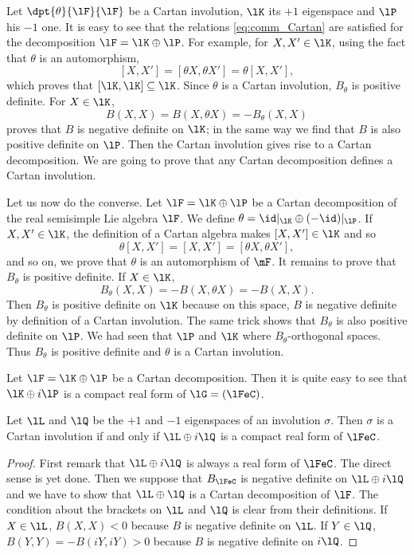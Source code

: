 Let $\dpt{\theta}{\lF}{\lF}$ be a Cartan involution, $\lK$ its $+1$ eigenspace and $\lP$ his $-1$ one. It is easy to see that the relations \eqref{eq:comm_Cartan} are satisfied for the decomposition  $\lF=\lK\oplus\lP$. For example, for $X,X'\in\lK$, using the fact that $\theta$ is an automorphism,
\[
   [X,X']=[\theta X,\theta X']=\theta[X,X'],
\]
which proves that $[\lK,\lK]\subseteq\lK$. Since $\theta$ is a Cartan involution, $B_{\theta}$ is positive definite. For $X\in\lK$,
\[
  B(X,X)=B(X,\theta X)=-B_{\theta}(X,X)
\]
proves that $B$ is negative definite on $\lK$; in the same way we find that $B$ is also positive definite on $\lP$. Then the Cartan involution gives rise to a Cartan decomposition. We are going to prove that any Cartan decomposition defines a Cartan involution.

Let us now do the converse. Let $\lF=\lK\oplus\lP$ be a Cartan decomposition of the real semisimple Lie algebra $\lF$. We define $\theta=\id|_{\lK}\oplus(-\id)|_{\lP}$. If $X,X'\in\lK$, the definition of a Cartan algebra makes $[X,X']\in\lK$ and so
\[
  \theta[X,X']=[X,X']=[\theta X,\theta X'],
\]
and so on, we prove that $\theta$ is an automorphism of $\mF$. It remains to prove that $B_{\theta}$ is positive definite. If $X\in\lK$,
\[
   B_{\theta}(X,X)=-B(X,\theta X)=-B(X,X).
\]
Then $B_{\theta}$ is positive definite on $\lK$ because on this space, $B$ is negative definite by definition of a Cartan involution. The same trick shows that $B_{\theta}$ is also positive definite on $\lP$. We had seen that $\lP$ and $\lK$ where $B_{\theta}$-orthogonal spaces. Thus $B_{\theta}$ is positive definite and $\theta$ is a Cartan involution.

Let $\lF=\lK\oplus\lP$ be a Cartan decomposition. Then it is quite easy to see that $\lK\oplus i\lP$ is a compact real form of $\lG=(\lFeC)$.

\begin{proposition}
Let $\lL$ and $\lQ$ be the $+1$ and $-1$ eigenspaces of an involution $\sigma$. Then $\sigma$ is a Cartan involution if and only if $\lL\oplus i\lQ$ is  a compact real form of $\lFeC$.
\end{proposition}

\begin{proof}
First remark that $\lL\oplus i\lQ$ is always a real form of $\lFeC$. The direct sense is yet done. Then we suppose that $B_{\lFeC}$ is negative definite on $\lL\oplus i\lQ$ and we have to show that $\lL\oplus\lQ$ is a Cartan decomposition of $\lF$. The condition about the brackets on $\lL$ and $\lQ$ is clear from their definitions. If $X\in\lL$, $B(X,X)<0$ because $B$ is negative definite on $\lL$. If $Y\in\lQ$, $B(Y,Y)=-B(iY,iY)>0$ because $B$ is negative definite on $i\lQ$.
\end{proof}

